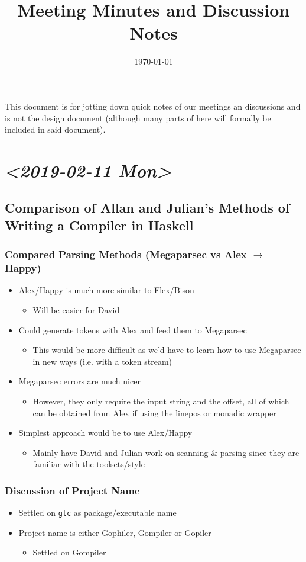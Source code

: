 \documentclass[11pt]{article}
\date{\today}
\title{Meeting Minutes and Discussion Notes}
\begin{document}
\maketitle
\tableofcontents

This document is for jotting down quick notes of our meetings an
discussions and is not the design document (although many parts of
here will formally be included in said document).
\section{\textit{<2019-02-11 Mon>}}
\label{sec:org784dcfd}
\subsection{Comparison of Allan and Julian's Methods of Writing a Compiler in Haskell}
\label{sec:org09a3bac}
\subsubsection{Compared Parsing Methods (Megaparsec vs Alex \(\to\) Happy)}
\label{sec:org5c27e6b}
\begin{itemize}
\item Alex/Happy is much more similar to Flex/Bison
\begin{itemize}
\item Will be easier for David
\end{itemize}
\item Could generate tokens with Alex and feed them to Megaparsec
\begin{itemize}
\item This would be more difficult as we'd have to learn how to use
Megaparsec in new ways (i.e. with a token stream)
\end{itemize}
\item Megaparsec errors are much nicer
\begin{itemize}
\item However, they only require the input string and the offset, all of
which can be obtained from Alex if using the linepos or monadic wrapper
\end{itemize}
\item Simplest approach would be to use Alex/Happy
\begin{itemize}
\item Mainly have David and Julian work on scanning \& parsing since they
are familiar with the toolsets/style
\end{itemize}
\end{itemize}
\subsubsection{Discussion of Project Name}
\label{sec:org0bc3839}
\begin{itemize}
\item Settled on \texttt{glc} as package/executable name
\item Project name is either Gophiler, Gompiler or Gopiler
\begin{itemize}
\item Settled on Gompiler
\end{itemize}
\end{itemize}
\end{document}
